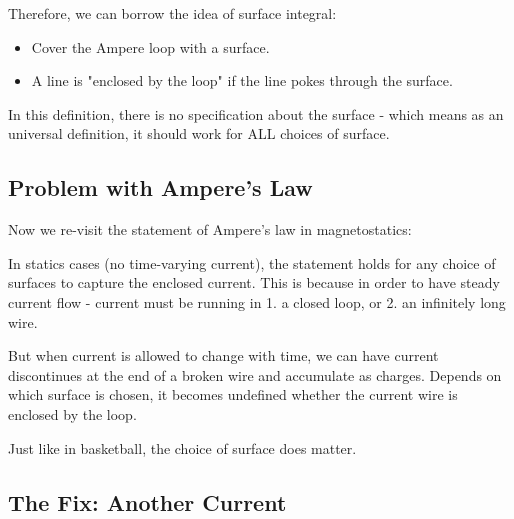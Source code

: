 \documentclass[class=article, crop=false, 12pt]{standalone}
\begin{document}
Therefore, we can borrow the idea of surface integral:
\begin{itemize}
    \item Cover the Ampere loop with a surface.
    \item A line is "enclosed by the loop" if the line pokes through the surface.
\end{itemize}


In this definition, there is no specification about the surface -
which means as an universal definition, 
it should work for ALL choices of surface.



\subsection{Problem with Ampere's Law}

Now we re-visit the statement of Ampere's law in magnetostatics:

In statics cases (no time-varying current), 
the statement holds for any choice of surfaces to capture the enclosed current.
This is because in order to have steady current flow - 
current must be running in 1. a closed loop, 
or 2. an infinitely long wire.


But when current is allowed to change with time, 
we can have current discontinues at the end of a broken wire and accumulate as charges.
Depends on which surface is chosen, 
it becomes undefined whether the current wire is enclosed by the loop.


Just like in basketball, the choice of surface does matter.






\subsection{The Fix: Another Current}
\end{document}
